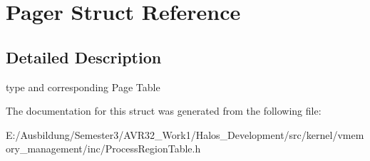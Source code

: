 \hypertarget{struct_pager}{
\section{Pager Struct Reference}
\label{struct_pager}
}


\subsection{Detailed Description}
type and corresponding Page Table 

The documentation for this struct was generated from the following file:\begin{CompactItemize}
\item 
E:/Ausbildung/Semester3/AVR32\_\-Work1/Halos\_\-Development/src/kernel/vmemory\_\-management/inc/ProcessRegionTable.h\end{CompactItemize}
